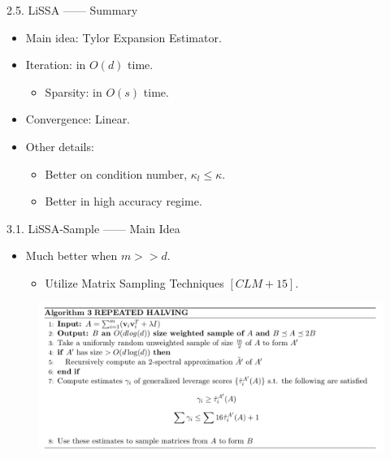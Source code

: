 \documentclass[pdf]{beamer}
\theoremstyle{remark}
\theoremstyle{definition}
\begin{document}
\begin{frame}{2.5. LiSSA —— Summary}
\begin{itemize}
	\item Main idea: Tylor Expansion Estimator.
	\item Iteration: in $O(d)$ time.
	\begin{itemize}
		\item Sparsity: in $O(s)$ time.
	\end{itemize}
	\item Convergence: Linear.
	\item Other details:
	\begin{itemize}
		\item Better on condition number, $\kappa_l \leq \kappa$.
		\item Better in high accuracy regime.
		
	\end{itemize}
\end{itemize}
\end{frame}


\begin{frame}{3.1. LiSSA-Sample —— Main Idea}
\begin{itemize}
	\item Much better when $m >> d$.
	\begin{itemize}
		\item Utilize Matrix Sampling Techniques $[CLM+15]$.
	\end{itemize}
\end{itemize}
\begin{figure}
	\includegraphics[scale=0.42]{fig/alg3.png}
\end{figure}
\end{frame}
\end{document}
